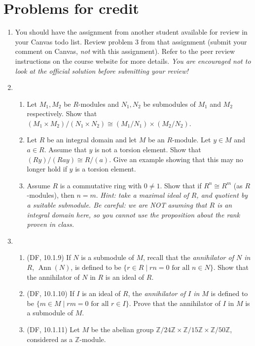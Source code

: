 \documentclass{amsart}
\theoremstyle{definition}
\newcommand{\Zz}{\mathbb{Z}}
\newcommand{\Ann}{\operatorname{Ann}}
\begin{document}
\section*{Problems for credit}

\begin{enumerate}
\item You should have the assignment from another student available for review in your Canvas todo list. Review problem 3 from that assignment (submit your comment on Canvas, \emph{not} with this assignment). Refer to the peer review instructions on the course website for more details. \emph{You are encouraged not to look at the official solution before submitting your review!}
\item 
  \begin{enumerate}
  \item Let $M_1, M_2$ be $R$-modules and $N_1, N_2$ be submodules of $M_1$ and $M_2$ respectively. Show that $(M_1 \times M_2) / (N_1 \times N_2) \cong (M_1 / N_1) \times (M_2 / N_2)$.
  \item Let $R$ be an integral domain and let $M$ be an $R$-module. Let $y \in M$ and $a \in R$. Assume that $y$ is not a torsion element. Show that $(R y) / (R ay) \cong R / (a)$. Give an example showing that this may no longer hold if $y$ is a torsion element.
  \item Assume $R$ is a commutative ring with $0 \neq 1$. Show that if $R^n \cong R^m$ (as $R$-modules), then $n = m$. \emph{Hint: take a maximal ideal of $R$, and quotient by a suitable submodule. Be careful: we are NOT asuming that $R$ is an integral domain here, so you cannot use the proposition about the rank proven in class.}
  \end{enumerate}
\item
  \begin{enumerate}
  \item (DF, 10.1.9) If $N$ is a submodule of $M$, recall that the \emph{annihilator of $N$ in $R$}, $\Ann (N)$, is defined to be $\{r \in R \mid rn = 0 \text{ for all } n \in N\}$. Show that the annihilator of $N$ in $R$ is an ideal of $R$.
  \item (DF, 10.1.10) If $I$ is an ideal of $R$, the \emph{annihilator of $I$ in $M$} is defined to be $\{m \in M \mid rm = 0 \text{ for all } r \in I\}$. Prove that the annihilator of $I$ in $M$ is a submodule of $M$.
  \item (DF, 10.1.11) Let $M$ be the abelian group $\Zz / 24 \Zz \times \Zz / 15 \Zz \times \Zz / 50 \Zz$, considered as a $\Zz$-module.

\end{enumerate}
\end{enumerate}
\end{document}
